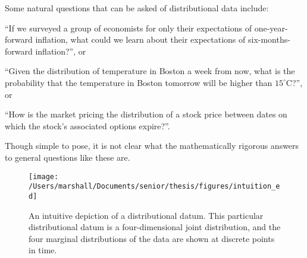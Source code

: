 Some natural questions that can be asked of distributional data include:
\begin{aenumerate}
\item ``If we surveyed a group of economists for only their expectations
of one-year-forward inflation, what could we learn about their expectations
of six-months-forward inflation?'', or
\item ``Given the distribution of temperature in Boston a week from now,
what is the probability that the temperature in Boston tomorrow will
be higher than $15^{\circ}\mbox{C}$?'', or
\item ``How is the market pricing the distribution of a stock price between
dates on which the stock's associated options expire?''.
\end{aenumerate}
Though simple to pose, it is not clear what the mathematically rigorous
answers to general questions like these are.
\begin{figure}
\begin{centering}
\texttt{[image: /Users/marshall/Documents/senior/thesis/figures/intuition\_ed]}
\par\end{centering}

\caption{\label{fig:dist-data}An intuitive depiction of a distributional datum.
This particular distributional datum is a four-dimensional joint distribution,
and the four marginal distributions of the data are shown at discrete
points in time.}
\end{figure}


